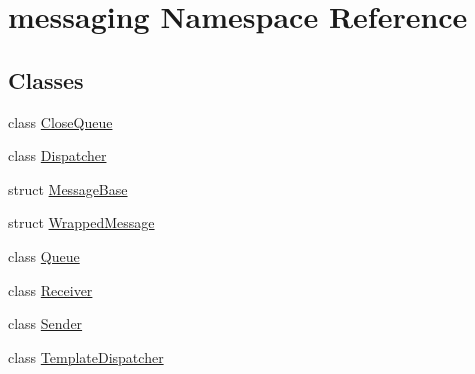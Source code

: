 \hypertarget{namespacemessaging}{\section{messaging Namespace Reference}
\label{namespacemessaging}
}
\subsection*{Classes}
\begin{DoxyCompactItemize}
\item 
class \hyperlink{classmessaging_1_1CloseQueue}{Close\-Queue}
\item 
class \hyperlink{classmessaging_1_1Dispatcher}{Dispatcher}
\item 
struct \hyperlink{structmessaging_1_1MessageBase}{Message\-Base}
\item 
struct \hyperlink{structmessaging_1_1WrappedMessage}{Wrapped\-Message}
\item 
class \hyperlink{classmessaging_1_1Queue}{Queue}
\item 
class \hyperlink{classmessaging_1_1Receiver}{Receiver}
\item 
class \hyperlink{classmessaging_1_1Sender}{Sender}
\item 
class \hyperlink{classmessaging_1_1TemplateDispatcher}{Template\-Dispatcher}
\end{DoxyCompactItemize}
